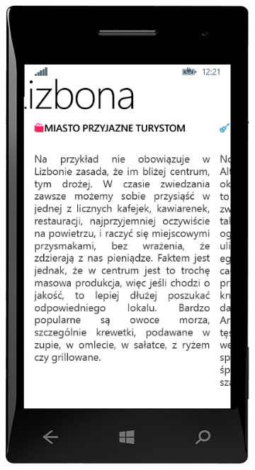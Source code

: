 \documentclass{book}
\begin{document}
\begin{figure}[H]
					\hfill
					\begin{subfigure}{0.3\textwidth}
						\includegraphics[width=\textwidth]{screenshots/mobile/mobile8.png}	
						\caption{\label{subfig:mobile_guidedetail2}}
					\end{subfigure}
					\hfill
					\begin{subfigure}{0.3\textwidth}

\end{subfigure}
\end{figure}
\end{document}
